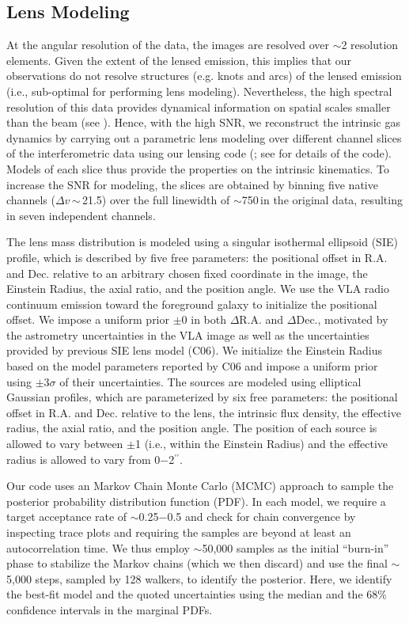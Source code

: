 \documentclass[]{emulateapj}
\begin{document}
\subsection{Lens Modeling} \label{sec:lensmodel}
At the angular resolution of the \bco data, the images are resolved over
$\sim$2 resolution elements. Given the extent of the lensed emission,
this implies that our \bco observations do not resolve
structures (e.g. knots and arcs) of the lensed emission
(i.e., sub-optimal for
performing lens modeling). Nevertheless, the high spectral
resolution of this data provides dynamical information on
spatial scales smaller than the beam (see ).
Hence, with the high SNR, we reconstruct the intrinsic gas
dynamics by carrying out a parametric lens modeling over different
channel slices of the interferometric data using our lensing code
\uvmcmcfit (\citealt{uvmcmcfit15a}; see \citealt{Bussmann15a} for details of
the code). Models of each slice thus provide the
properties on the intrinsic kinematics. To increase the SNR for modeling, the
slices are obtained by binning five native channels
($\Delta v$\,$\sim$\,21.5\kms) over the full
linewidth of $\sim$750\,\kms in the original data, resulting in seven
independent channels.

The lens mass distribution is modeled using a singular isothermal
ellipsoid (SIE) profile, which is described by five free parameters: the
positional offset in R.A. and Dec. relative to an arbitrary chosen
fixed coordinate in the image, the Einstein Radius, the axial ratio, and the
position angle. We use the VLA radio continuum emission toward
the foreground galaxy to initialize the positional offset. We impose a
uniform prior $\pm$0 in both $\Delta$R.A. and $\Delta$Dec.,
motivated by the astrometry uncertainties in the VLA image as well as
the uncertainties provided by previous SIE lens model (C06).
We initialize the Einstein Radius based on the model parameters reported by C06
and impose a uniform prior using $\pm$3$\sigma$ of their uncertainties.
The sources are modeled using elliptical Gaussian profiles, which are
parameterized by six free parameters: the positional offset in R.A.
and Dec. relative to the lens, the intrinsic flux density, the effective
radius, the axial ratio, and the position angle. The position of each source
is allowed to vary between $\pm$1 (i.e., within the Einstein Radius)
and the effective radius is allowed to vary from 0$-$2$^{\prime\prime}$.

Our code uses an Markov Chain Monte Carlo (MCMC) approach to sample the
posterior probability distribution function (PDF).
In each model, we require a target acceptance rate of $\sim$0.25$-$0.5
and check for chain convergence by inspecting trace plots
and requiring the samples are beyond at least an autocorrelation time.
We thus employ $\sim$50,000 samples as the initial ``burn-in'' phase
to stabilize the Markov chains (which we then discard) and
use the final $\sim$5,000 steps, sampled by 128 walkers, to identify
the posterior. Here, we
identify the best-fit model and the quoted uncertainties using the
median and the 68\% confidence intervals in the marginal PDFs.

\end{document}
